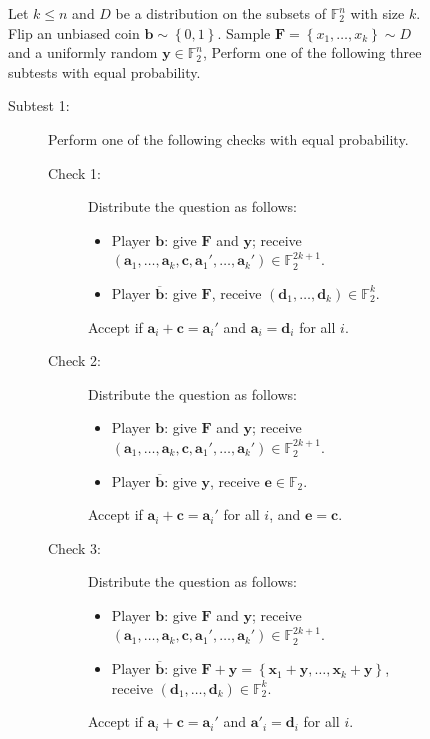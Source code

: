 \documentclass[10pt,a4paper]{article}
\theoremstyle{plain}
\theoremstyle{definition}
\newcommand {\set} [1] {\ensuremath{ \left\lbrace #1 \right\rbrace }}
\newenvironment{Algorithm}{\begin{framed}}{\end{framed}}
\newcommand{\1}{\mathbb{1}} %
\newcommand{\bF}{\mathbb{F}}
\newcommand{\ba}{\pmb{a}}
\newcommand{\bb}{\pmb{b}}
\newcommand{\bc}{\pmb{c}}
\newcommand{\bd}{\pmb{d}}
\newcommand{\be}{\pmb{e}}
\newcommand{\bx}{\pmb{x}}
\newcommand{\by}{\pmb{y}}
\newcommand{\pmbF}{\pmb{F}}
\begin{document}
\begin{figure}    
\begin{Algorithm}
    Let $k \leq n$ and $D$ be a distribution on the subsets of $\bF_2^n$ with size $k$.
    Flip an unbiased coin $\bb \sim \set{0,1}$.
    Sample $\pmbF = \set{x_1, \ldots, x_k} \sim D$ and a uniformly random $\by \in \bF_2^n$,
    Perform one of the following three subtests with equal probability.
    \begin{description}
	\item[Subtest 1:] Perform one of the following checks with equal probability.
    \begin{description}
        \item[Check 1:] Distribute the question as follows:
        \begin{itemize}
            \item Player $\bb$: give $\pmbF$ and $\by$; receive $(\ba_1, \ldots, \ba_k, \bc, \ba_1', \ldots, \ba_k') \in \bF_2^{2k+1}$.
            \item Player $\overline{\bb}$: give $\pmbF$, receive $(\bd_1,\ldots, \bd_k) \in \bF_2^k$.
        \end{itemize}
        Accept if $\ba_i + \bc = \ba_i'$ and $\ba_i = \bd_i$ for all $i$.
        \item [Check 2:] Distribute the question as follows:
        \begin{itemize}
            \item Player $\bb$: give $\pmbF$ and $\by$; receive $(\ba_1, \ldots, \ba_k, \bc, \ba_1', \ldots, \ba_k') \in \bF_2^{2k+1}$.
            \item Player $\overline{\bb}$: give $\by$, receive $\be \in \bF_2$.
        \end{itemize}
        Accept if $\ba_i + \bc = \ba_i'$ for all $i$, and $\be = \bc$.
        \item[Check 3:]
        Distribute the question as follows:
        \begin{itemize}
            \item Player $\bb$: give $\pmbF$ and $\by$; receive $(\ba_1, \ldots, \ba_k, \bc, \ba_1', \ldots, \ba_k') \in \bF_2^{2k+1}$.
            \item Player $\overline{\bb}$: give $\pmbF+\by = \set{\bx_1+\by, \ldots, \bx_k+\by}$, receive $(\bd_1,\ldots, \bd_k) \in \bF_2^k$.
        \end{itemize}
        Accept if $\ba_i + \bc = \ba_i'$ and $\ba'_i = \bd_i$ for all $i$.
    \end{description}

\end{description}
\end{Algorithm}
\end{figure}
\end{document}
